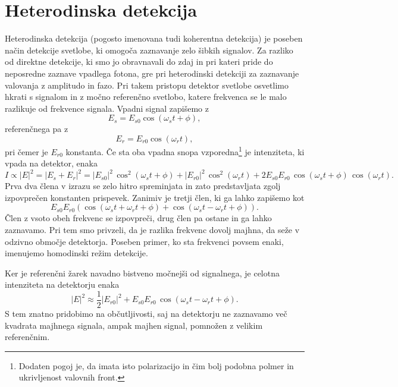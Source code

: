 \section{Heterodinska detekcija}
Heterodinska detekcija (pogosto imenovana tudi koherentna detekcija) je poseben način
detekcije svetlobe, ki omogoča zaznavanje zelo šibkih signalov. Za razliko od direktne detekcije,
ki smo jo obravnavali do zdaj in pri kateri pride do neposredne zaznave vpadlega fotona, 
gre pri heterodinski detekciji za zaznavanje valovanja z amplitudo in fazo. Pri takem 
pristopu detektor svetlobe osvetlimo hkrati s signalom in z močno referenčno svetlobo, 
katere frekvenca se le malo razlikuje od frekvence signala.
Vpadni signal zapišemo z
\begin{equation}
E_s = E_{s0} \cos(\omega_st+\phi),
\end{equation}
referenčnega pa z
\begin{equation}
E_r = E_{r0} \cos(\omega_rt),
\end{equation}
pri čemer je $E_{r0}$ konstanta. Če sta oba vpadna snopa vzporedna\footnote{Dodaten pogoj je,
da imata isto polarizacijo in čim bolj podobna polmer in ukrivljenost valovnih front.} je intenziteta, 
ki vpada na detektor, enaka
\begin{equation}
I \propto |E|^2 = |E_s+E_r|^2 = |E_{s0}|^2 \, \cos^2(\omega_st+\phi)+
|E_{r0}|^2 \, \cos^2(\omega_rt) + 2E_{s0}E_{r0}\, \cos(\omega_st+\phi)\, \cos(\omega_rt).
\end{equation}
Prva dva člena v izrazu se zelo hitro spreminjata in zato predstavljata zgolj 
izpovprečen konstanten prispevek. Zanimiv je tretji člen, ki ga lahko zapišemo
kot
\begin{equation}
E_{s0}E_{r0}\left( \cos(\omega_st+\omega_rt+\phi)+\cos(\omega_st-\omega_rt+\phi)\right).
\end{equation}
Člen z vsoto obeh frekvenc se izpovpreči, drug člen pa ostane in ga lahko zaznavamo. 
Pri tem smo privzeli, da je razlika frekvenc dovolj majhna, da seže v odzivno območje
detektorja. Poseben primer, ko sta frekvenci povsem enaki, imenujemo homodinski režim 
detekcije. 

Ker je referenčni žarek navadno bistveno močnejši od signalnega, je celotna intenziteta
na detektorju enaka
\begin{equation}
|E|^2 \approx \frac{1}{2}|E_{r0}|^2 + E_{s0}E_{r0}\,\cos(\omega_st-\omega_rt+\phi).
\end{equation}
S tem znatno pridobimo na občutljivosti, saj na detektorju ne zaznavamo več 
kvadrata majhnega signala, ampak majhen signal, pomnožen z velikim referenčnim. 

